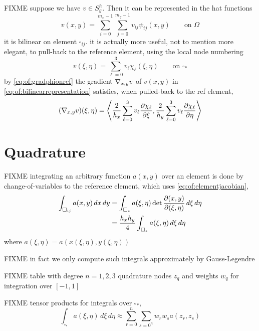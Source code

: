 FIXME suppose we have $v \in S_g^h$.  Then it can be represented in the hat functions
\begin{equation}
v(x,y) = \sum_{i=0}^{m_x-1} \sum_{j=0}^{m_y-1} v_{ij} \psi_{ij}(x,y)  \qquad \text{on } \Omega \label{eq:of:bilinearrepresentation}
\end{equation}
it is bilinear on element $\square_{ij}$.  it is actually more useful, not to mention more elegant, to pull-back to the reference element, using the local node numbering
\begin{equation}
v(\xi,\eta) = \sum_{\ell=0}^3 v_\ell \chi_\ell(\xi,\eta)  \qquad \text{on } \square_\ast \label{eq:of:bilinearrepresentationref}
\end{equation}
by \eqref{eq:of:gradphionref} the gradient $\nabla_{x,y} v$ of $v(x,y)$ in \eqref{eq:of:bilinearrepresentation} satisfies, when pulled-back to the ref element,
\begin{equation}
  (\nabla_{x,y} v)(\xi,\eta) = \left<\frac{2}{h_x} \sum_{\ell=0}^3 v_\ell \frac{\partial\chi_\ell}{\partial \xi}, \frac{2}{h_y} \sum_{\ell=0}^3 v_\ell \frac{\partial\chi_\ell}{\partial \eta}\right> \label{eq:of:gradrepref}
\end{equation}


\section{Quadrature}

FIXME integrating an arbitrary function $a(x,y)$ over an element is done by change-of-variables to the reference element, which uses \eqref{eq:of:elementjacobian},
\begin{align}
\int_{\square_{ij}} a(x,y)\,dx\,dy &= \int_{\square_\ast} a(\xi,\eta) \det\frac{\partial(x,y)}{\partial(\xi,\eta)}\,d\xi\,d\eta  \label{eq:of:changeofvars} \\
&= \frac{h_x h_y}{4} \int_{\square_\ast} a(\xi,\eta) \,d\xi\,d\eta \notag
\end{align}
where $a(\xi,\eta)=a(x(\xi,\eta),y(\xi,\eta))$

FIXME in fact we only compute such integrals approximately by Gauss-Legendre

FIXME table with degree $n=1,2,3$ quadrature nodes $z_q$ and weights $w_q$ for integration over $[-1,1]$

FIXME tensor products for integrals over $\square_\ast$,
    $$\int_{\square_\ast} a(\xi,\eta) \,d\xi\,d\eta \approx \sum_{r=0}^n \sum_{s=0^n} w_r w_s a(z_r,z_s)$$


\clearpage
\newpage
